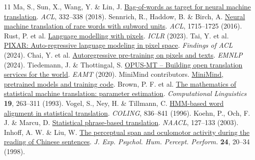 \documentclass[10pt,a4paper]{article}
\begin{document}
{\footnotesize
\begin{thebibliography}{11}\setlength{\itemsep}{0pt}
 Ma, S., Sun, X., Wang, Y. \& Lin, J. \href{https://aclanthology.org/P18-2053/}{Bag-of-words as target for neural machine translation}. \textit{ACL}, 332--338 (2018).
 Sennrich, R., Haddow, B. \& Birch, A. \href{https://aclanthology.org/P16-1162/}{Neural machine translation of rare words with subword units}. \textit{ACL}, 1715--1725 (2016).
 Rust, P. et al. \href{https://arxiv.org/abs/2207.06991}{Language modelling with pixels}. \textit{ICLR} (2023).
 Tai, Y. et al. \href{https://aclanthology.org/2024.findings-acl.874/}{PIXAR: Auto-regressive language modeling in pixel space}. \textit{Findings of ACL} (2024).
 Chai, Y. et al. \href{https://aclanthology.org/2024.emnlp-main.182/}{Autoregressive pre-training on pixels and texts}. \textit{EMNLP} (2024).
 Tiedemann, J. \& Thottingal, S. \href{https://aclanthology.org/2020.eamt-1.61/}{OPUS-MT -- Building open translation services for the world}. \textit{EAMT} (2020).
 MiniMind contributors. \href{https://github.com/jingyaogong/minimind/tree/858008eb98da4428f78053a1cc4d3a3bd5973629}{MiniMind, pretrained models and training code}.
 Brown, P. F. et al. \href{https://aclanthology.org/J93-2003/}{The mathematics of statistical machine translation: parameter estimation}. \textit{Computational Linguistics} \textbf{19}, 263--311 (1993).
 Vogel, S., Ney, H. \& Tillmann, C. \href{https://aclanthology.org/C96-2141/}{HMM-based word alignment in statistical translation}. \textit{COLING}, 836--841 (1996).
 Koehn, P., Och, F. J. \& Marcu, D. \href{https://aclanthology.org/N03-1017/}{Statistical phrase-based translation}. \textit{NAACL}, 127--133 (2003).
 Inhoff, A. W. \& Liu, W. \href{https://pubmed.ncbi.nlm.nih.gov/9483822/}{The perceptual span and oculomotor activity during the reading of Chinese sentences}. \textit{J. Exp. Psychol. Hum. Percept. Perform.} \textbf{24}, 20--34 (1998).
\end{thebibliography}}
\end{document}
